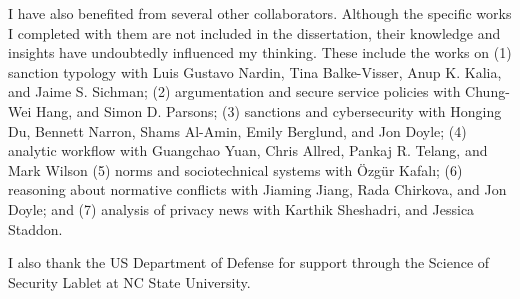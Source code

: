 \documentclass[11pt,          %
               phd,           %
               onehalfspacing %
               ]{ncsuthesis}
\newlength{\chapterfootskip}
\begin{document}
I have also benefited from several other collaborators. Although the
specific works I completed with them are not included in the
dissertation, their knowledge and insights have undoubtedly influenced
my thinking. These include the works on (1) sanction typology
\citep{Nardin-KER16-Classifying} with Luis Gustavo Nardin, Tina
Balke-Visser, Anup K. Kalia, and Jaime S. Sichman; (2) argumentation and
secure service policies \citep{Ajmeri-Computer17-Aragorn} with Chung-Wei
Hang, and Simon D. Parsons; (3) sanctions and cybersecurity
\citep{Du-HotSoS15,Du-Acyse15} with Honging Du, Bennett Narron, Shams
Al-Amin, Emily Berglund, and Jon Doyle; (4) analytic workflow
\citep{Yuan-RCIS15} with Guangchao Yuan, Chris Allred, Pankaj R. Telang,
and Mark Wilson (5) norms and sociotechnical systems
\citep{Kafali-IS16-Revani,Kafali-AAAI17-Kont} with {\"O}zg{\"u}r
Kafal{\i}; (6) reasoning about normative conflicts
\citep{Ajmeri-IJCAI16-Coco,Jiang-HotSoS16} with Jiaming Jiang, Rada
Chirkova, and Jon Doyle; and (7) analysis of privacy news
\citep{Sheshadri-PST17-News} with Karthik Sheshadri, and Jessica
Staddon.

I also thank the US Department of Defense for support through the
Science of Security Lablet at NC State University.




\appendix




\backmatter
\end{document}

